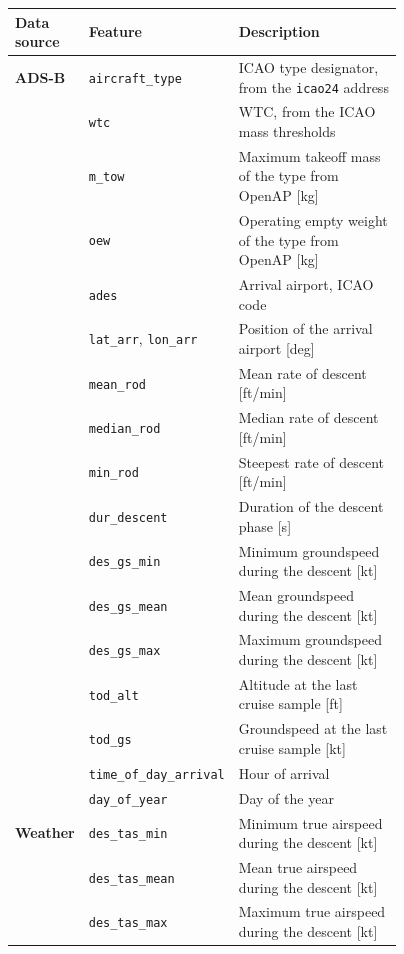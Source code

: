 \documentclass[
  manuscript=proceedings,  %
  layout=preprint,  %
  year=2026,
  volume=x,
]{extra/joas}
\begin{document}
\begin{table}[htbp]
    \centering
    \small
    \begin{tabular}{@{}lp{0.22\linewidth}p{0.55\linewidth}@{}}
    \toprule
    \textbf{Data source} & \textbf{Feature} & \textbf{Description} \\
    \midrule

    \textbf{ADS-B}
        & \texttt{aircraft\_type} & ICAO type designator, from the \texttt{icao24} address \\
    & \texttt{wtc} & WTC, from the ICAO mass thresholds \\
    & \texttt{m\_tow} & Maximum takeoff mass of the type from OpenAP [kg] \\
    & \texttt{oew} & Operating empty weight of the type from OpenAP [kg] \\
    & \texttt{ades} & Arrival airport, ICAO code \\
    & \texttt{lat\_arr}, \texttt{lon\_arr} & Position of the arrival airport [deg] \\
    & \texttt{mean\_rod} & Mean rate of descent [ft/min] \\
    & \texttt{median\_rod} & Median rate of descent [ft/min] \\
    & \texttt{min\_rod} & Steepest rate of descent [ft/min] \\
    & \texttt{dur\_descent} & Duration of the descent phase [s] \\
    & \texttt{des\_gs\_min} & Minimum groundspeed during the descent [kt] \\
    & \texttt{des\_gs\_mean} & Mean groundspeed during the descent [kt] \\
    & \texttt{des\_gs\_max} & Maximum groundspeed during the descent [kt] \\
    & \texttt{tod\_alt} & Altitude at the last cruise sample [ft] \\
    & \texttt{tod\_gs} & Groundspeed at the last cruise sample [kt] \\
    & \texttt{time\_of\_day\_arrival} & Hour of arrival \\
    & \texttt{day\_of\_year} & Day of the year \\[3pt]
\midrule
    \textbf{Weather}
        & \texttt{des\_tas\_min} & Minimum true airspeed during the descent [kt] \\
    & \texttt{des\_tas\_mean} & Mean true airspeed during the descent [kt] \\
    & \texttt{des\_tas\_max} & Maximum true airspeed during the descent [kt] \\

\end{tabular}
\end{table}
\end{document}
